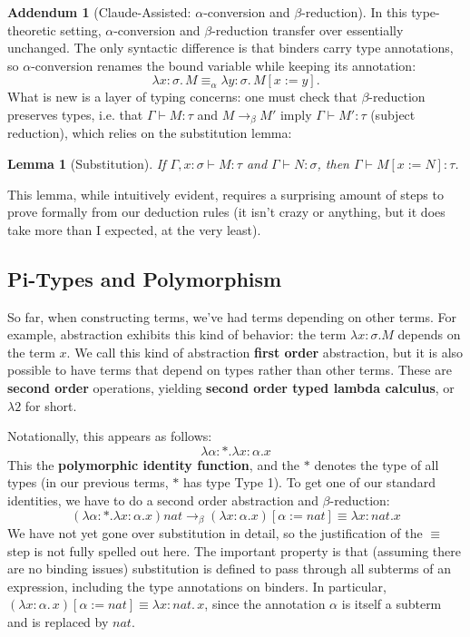 \documentclass{article}
\newtheorem{lemma}[theorem]{Lemma}
\theoremstyle{definition}
\newtheorem{addendum}{Addendum}
\newcommand{\1}{\mathbb{1}}
\newcommand{\0}{\mathbb{0}}
\begin{document}
\begin{addendum}[Claude-Assisted: $\alpha$-conversion and $\beta$-reduction]
In this type-theoretic setting, $\alpha$-conversion and $\beta$-reduction transfer over essentially unchanged. The only syntactic difference is that binders carry type annotations, so $\alpha$-conversion renames the bound
variable while keeping its annotation:
\[\lambda x{:}\sigma.\,M \equiv_\alpha \lambda y{:}\sigma.\,M[x:=y].\]
What is new is a layer of typing concerns: one must check that $\beta$-reduction preserves types, i.e. that $\Gamma \vdash M : \tau$ and $M \to_\beta M'$ imply $\Gamma \vdash M' : \tau$ (subject reduction), which relies on the substitution lemma:

\begin{lemma}[Substitution]
If $\Gamma, x{:}\sigma \vdash M : \tau$ and $\Gamma \vdash N : \sigma$, then $\Gamma \vdash M[x:=N] : \tau$.
\end{lemma}

This lemma, while intuitively evident, requires a surprising amount of steps to prove formally from our deduction rules (it isn't crazy or anything, but it does take more than I expected, at the very least). 
\end{addendum}

\subsection{Pi-Types and Polymorphism}

So far, when constructing terms, we've had terms depending on other terms. For example, abstraction exhibits this kind of behavior: the term $\lambda x:\sigma . M$ depends on the term $x$. We call this kind of abstraction \textbf{first order} abstraction, but it is also possible to have terms that depend on types rather than other terms. These are \textbf{second order} operations, yielding \textbf{second order typed lambda calculus}, or $\lambda 2$ for short. 

Notationally, this appears as follows:
\[\lambda \alpha : * . \lambda x : \alpha . x\]
This the \textbf{polymorphic identity function}, and the $*$ denotes the type of all types (in our previous terms, $*$ has type Type 1). To get one of our standard identities, we have to do a second order abstraction and $\beta$-reduction:
\[(\lambda \alpha : * . \lambda x : \alpha . x) nat \to_\beta (\lambda x : \alpha.x)[\alpha := nat] \equiv  \lambda x : nat. x\]
We have not yet gone over substitution in detail, so the justification of the $\equiv$ step is not fully spelled out here. The important property is that (assuming there are no binding issues) substitution is defined to pass through all subterms of an expression, including the type annotations on binders. In particular,
$(\lambda x{:}\alpha.\,x)[\alpha := \textit{nat}] \equiv \lambda x{:}\textit{nat}.\,x$,
since the annotation $\alpha$ is itself a subterm and is replaced by $\textit{nat}$.
\end{document}
